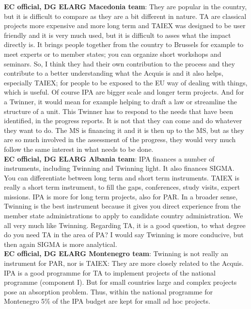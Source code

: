 \textbf{EC official, DG ELARG Macedonia team}: They are popular in the country, but it is difficult to compare as they are a bit different in nature. TA are classical projects more expensive and more long term and TAIEX was designed to be user friendly and it is very much used, but it is difficult to asses what the impact directly is. It brings people together from the country to Brussels for example to meet experts or to member states; you can organize short workshops and seminars. So, I think they had their own contribution to the process and they contribute to a better understanding what the Acquis is and it also helps, especially TAIEX; for people to be exposed to the EU way of dealing with things, which is useful. Of course IPA are bigger scale and longer term projects. And for a Twinner, it would mean for example helping to draft a law or streamline the structure of a unit. This Twinner has to respond to the needs that have been identified, in the progress reports. It is not that they can come and do whatever they want to do. The MS is financing it and it is then up to the MS, but as they are so much involved in the assessment of the progress, they would very much follow the same interest in what needs to be done.  \\
\textbf{EC official, DG ELARG Albania team}: IPA finances a number of instruments, including Twinning and Twinning light. It also finances SIGMA. You can differentiate between long term and short term instruments. TAIEX is really a short term instrument, to fill the gaps, conferences, study visits, expert missions. IPA is more for long term projects, also for PAR. In a broader sense, Twinning is the best instrument because it gives you direct experience from the member state administrations to apply to candidate country administration. We all very much like Twinning. Regarding TA, it is a good question, to what degree do you need TA in the area of PA? I would say Twinning is more conducive, but then again SIGMA is more analytical.\\
\textbf{EC official, DG ELARG Montenegro team}: Twinning is not really an instrument for PAR, nor is TAIEX: They are more closely related to the Acquis. IPA is a good programme for TA to implement projects of the national programme (component I). But for small countries large and complex projects pose an absorption problem. Thus, within the national programme for Montenegro 5\% of the IPA budget are kept for small ad hoc projects.\\

